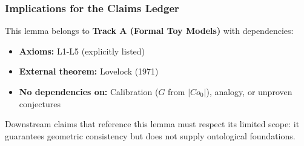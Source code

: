 \subsubsection{Implications for the Claims Ledger}
This lemma belongs to \textbf{Track A (Formal Toy Models)} with dependencies:
\begin{itemize}
\item \textbf{Axioms:} L1-L5 (explicitly listed)
\item \textbf{External theorem:} Lovelock (1971)
\item \textbf{No dependencies on:} Calibration ($G$ from $|Co_0|$), analogy, or unproven conjectures
\end{itemize}

Downstream claims that reference this lemma must respect its limited scope: it guarantees geometric consistency but does not supply ontological foundations.
